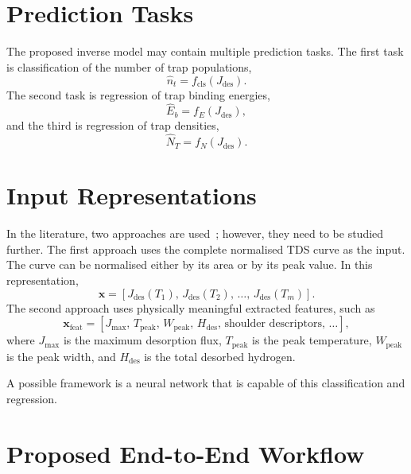 \documentclass[a4paper,12pt,oneside]{report}
\begin{document}
\section{Prediction Tasks}
\label{sec:tasks}
 
The proposed inverse model may contain multiple prediction tasks. The first task is
classification of the number of trap populations,
\begin{equation}
  \hat{n}_t = f_{\mathrm{cls}}\!\left(J_{\mathrm{des}}\right).
  \label{eq:cls}
\end{equation}
The second task is regression of trap binding energies,
\begin{equation}
  \hat{E}_b = f_E\!\left(J_{\mathrm{des}}\right),
  \label{eq:regE}
\end{equation}
and the third is regression of trap densities,
\begin{equation}
  \hat{N}_T = f_N\!\left(J_{\mathrm{des}}\right).
  \label{eq:regN}
\end{equation}
 
\section{Input Representations}
\label{sec:inputs}
 
In the literature, two approaches are used~\cite{Marrani2025,Yang2025}; however,
they need to be studied further. The first approach uses the complete normalised TDS
curve as the input. The curve can be normalised either by its area or by its peak
value. In this representation,
\begin{equation}
  \mathbf{x} = \left[ J_{\mathrm{des}}(T_1),\, J_{\mathrm{des}}(T_2),\, \dots,\, J_{\mathrm{des}}(T_m) \right].
  \label{eq:xfull}
\end{equation}
The second approach uses physically meaningful extracted features, such as
\begin{equation}
  \mathbf{x}_{\mathrm{feat}} = \left[ J_{\max},\, T_{\mathrm{peak}},\, W_{\mathrm{peak}},\,
  H_{\mathrm{des}},\, \text{shoulder descriptors},\, \dots \right],
  \label{eq:xfeat}
\end{equation}
where $J_{\max}$ is the maximum desorption flux, $T_{\mathrm{peak}}$ is the peak
temperature, $W_{\mathrm{peak}}$ is the peak width, and $H_{\mathrm{des}}$ is the
total desorbed hydrogen.
 
A possible framework is a neural network that is capable of this classification and
regression.
 
\section{Proposed End-to-End Workflow}
\label{sec:workflow}
 
\end{document}
